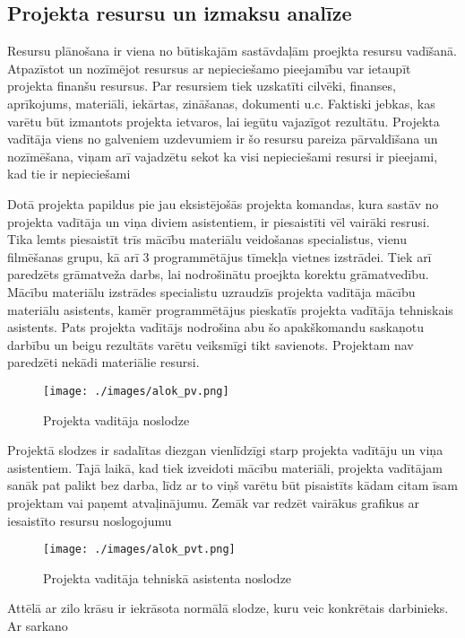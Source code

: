 \subsection{Projekta resursu un izmaksu analīze}
Resursu plānošana ir viena no būtiskajām sastāvdaļām proejkta resursu vadīšanā. Atpazīstot un
nozīmējot resursus ar nepieciešamo pieejamību var ietaupīt projekta finanšu resursus. Par resursiem
tiek uzskatīti cilvēki, finanses, aprīkojums, materiāli, iekārtas, zināšanas, dokumenti u.c.
Faktiski jebkas, kas varētu būt izmantots projekta ietvaros, lai iegūtu vajazīgot rezultātu.
Projekta vadītāja viens no galveniem uzdevumiem ir šo resursu pareiza pārvaldīšana un nozīmēšana,
viņam arī vajadzētu sekot ka visi nepieciešami resursi ir pieejami, kad tie ir nepieciešami
\par
Dotā projekta papildus pie jau eksistējošās projekta komandas, kura sastāv no projekta
vadītāja un viņa diviem asistentiem, ir piesaistīti vēl vairāki resrusi. Tika lemts piesaistīt
trīs mācību materiālu veidošanas specialistus, vienu filmēšanas grupu, kā arī 3 programmētājus
tīmekļa vietnes izstrādei. Tiek arī paredzēts grāmatveža darbs, lai nodrošinātu proejkta korektu 
grāmatvedību. Mācību materiālu izstrādes specialistu uzraudzīs projekta vadītāja mācību materiālu
asistents, kamēr programmētājus pieskatīs projekta vadītāja tehniskais asistents. Pats projekta
vadītājs nodrošina abu šo apakškomandu saskaņotu darbību un beigu rezultāts varētu veiksmīgi tikt
savienots. Projektam nav paredzēti nekādi materiālie resursi.
\par
\begin{figure}[h!]
  \centering
  \texttt{[image: ./images/alok\_pv.png]}
  \label{image:alok_pv}
  \caption{Projekta vaditāja noslodze}
\end{figure}
Projektā slodzes ir sadalītas diezgan vienlīdzīgi starp projekta vadītāju un viņa asistentiem.
Tajā laikā, kad tiek izveidoti mācību materiāli, projekta vadītājam sanāk pat palikt bez darba,
līdz ar to viņš varētu būt pisaistīts kādam citam īsam projektam vai paņemt atvaļinājumu.
Zemāk var redzēt vairākus grafikus ar iesaistīto resursu noslogojumu
\par
\begin{figure}[h!]
  \centering
  \texttt{[image: ./images/alok\_pvt.png]}
  \label{image:alok_pvt}
  \caption{Projekta vaditāja tehniskā asistenta noslodze}
\end{figure}
Attēlā ar zilo krāsu ir iekrāsota normālā slodze, kuru veic konkrētais darbinieks. Ar sarkano
